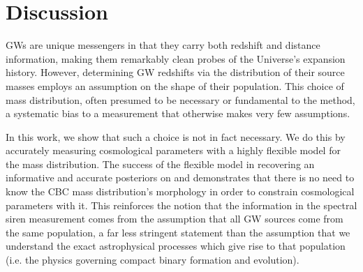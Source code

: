 \documentclass[]{aastex631}
\begin{document}

\section{Discussion}
\label{sec:discussion}

\acp{GW} are unique messengers in that they carry both redshift and distance information, making them remarkably clean probes of the Universe's expansion history. 
However,  %
determining \ac{GW} redshifts via the distribution of their source masses employs an assumption on the shape of their population. 
This choice of mass distribution, often presumed to be necessary or fundamental to the method,  %
a systematic bias to a measurement  that otherwise makes very few assumptions.
    
In this work, we show that such a choice is not in fact necessary.
We do this by accurately measuring cosmological parameters with a highly flexible model for the mass distribution. 
The success of the flexible model in recovering an informative and accurate posteriors on \Ho{} and \Omm{} demonstrates that there is no need to know the \ac{CBC} mass distribution's morphology in order to constrain cosmological parameters with it.
This reinforces the notion that the information in the spectral siren measurement comes from the assumption that all \ac{GW} sources come from the same population, a far less stringent statement than the assumption that we understand the exact astrophysical processes which give rise to that population (i.e. the physics governing compact binary formation and evolution).
    
\end{document}
